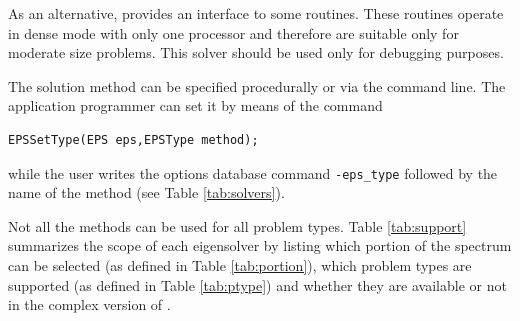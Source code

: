 As an alternative, \slepc provides an interface to some \lapack routines. These routines operate in dense mode with only one processor and therefore are suitable only for moderate size problems. This solver should be used only for debugging purposes.

The solution method can be specified procedurally or via the command line. The application programmer can set it by means of the command
	\begin{Verbatim}[fontsize=\small]
	EPSSetType(EPS eps,EPSType method);
	\end{Verbatim}
while the user writes the options database command \Verb!-eps_type! followed by the name of the method (see Table \ref{tab:solvers}).

	Not all the methods can be used for all problem types. Table \ref{tab:support} summarizes the scope of each eigensolver by listing which portion of the spectrum can be selected (as defined in Table \ref{tab:portion}), which problem types are supported (as defined in Table \ref{tab:ptype}) and whether they are available or not in the complex version of \slepc. %

